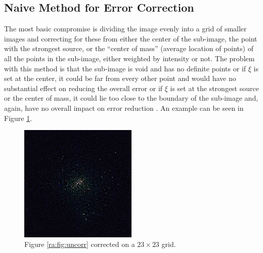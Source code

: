 \subsection{Naive Method for Error Correction}
The most basic compromise is dividing the image evenly into a grid of smaller images and correcting for these from either the center of the sub-image, the point with the strongest source, or the ``center of mass'' (average location of points) of all the points in the sub-image, either weighted by intensity or not. The problem with this method is that the sub-image is void and has no definite points or if $\xi$ is set at the center, it could be far from every other point and would have no substantial effect on reducing the overall error or if $\xi$ is set at the strongest source or the center of mass, it could lie too close to the boundary of the sub-image and, again, have no overall impact on error reduction \citep{tasse2016tessellation}. An example can be seen in Figure \ref{ra:fig:cor23}.
%
\begin{figure}[H]
	\centering
	\includegraphics[width=0.5\textwidth]{Images/corrected-23x23.png}
	\caption{Figure \ref{ra:fig:uncorr} corrected on a $23\times23$ grid.}
	\label{ra:fig:cor23}
\end{figure}



